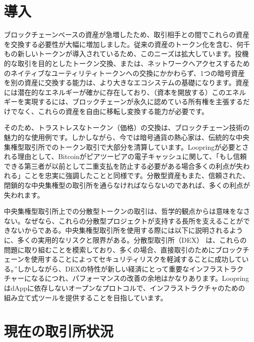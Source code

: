 \documentclass{article}
\begin{document}
\begin{multicols}{2}
\section{導入\label{sec:introduction}}

ブロックチェーンベースの資産が急増したため、取引相手との間でこれらの資産を交換する必要性が大幅に増加しました。従来の資産のトークン化を含む、何千もの新しいトークンが導入されているため、このニーズは拡大しています。投機的な取引を目的としたトークン交換、または、ネットワークへアクセスするためのネイティブなユーティリティトークンへの交換にかかわらず、1つの暗号資産を別の資産に交換する能力は、より大きなエコシステムの基礎になります。資産には潜在的なエネルギーが確かに存在\cite{desotocapital}しており、（資本を開放する）このエネルギーを実現するには、ブロックチェーンが永久に認めている所有権を主張するだけでなく、これらの資産を自由に移転し変換する能力が必要です。
 
そのため、トラストレスなトークン（価格）の交換は、ブロックチェーン技術の魅力的な使用例です。しかしながら、今では暗号通貨の熱心家は、伝統的な中央集権型取引所でのトークン取引で大部分を清算しています。Loopringが必要とされる理由として、Bitcoin\cite{nakamoto2008bitcoin}がピアツーピアの電子キャッシュに関して、「もし信頼できる第三者が以前として二重支払を防止する必要がある場合多くの利点が失われる」ことを忠実に強調したことと同様です。分散型資産もまた、信頼された、閉鎖的な中央集権型の取引所を通らなければならないのであれば、多くの利点が失われます。

中央集権型取引所上での分散型トークンの取引は、哲学的観点からは意味をなさない。なぜなら、これらの分散型プロジェクトが支持する長所を支えることができないからである。中央集権型取引所を使用する際には以下に説明されるように、多くの実用的なリスクと限界がある。分散型取引所（DEX）\cite{schuh2015bitshares} \cite{bancor} \cite{kyber}は、これらの問題に取り組むことを模索しており、多くの場合、直接取引のためにブロックチェーンを使用することによってセキュリティリスクを軽減することに成功している。”しかしながら、DEXの特性が新しい経済にとって重要なインフラストラクチャーになるにつれ、パフォーマンスの改善の余地はかなりあります。LoopringはdAppに依存しないオープンなプロトコルで、インフラストラクチャのための組み立て式ツールを提供することを目指しています。

\section{現在の取引所状況\label{sec:current_exchange_landscape}}


\end{multicols}
\end{document}
